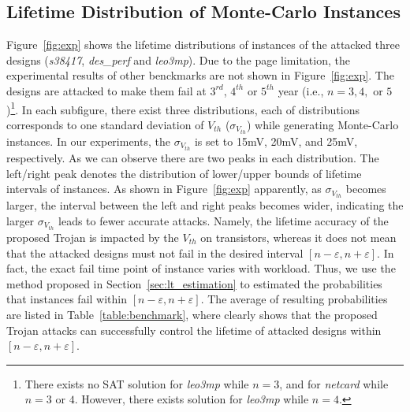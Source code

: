 \subsection{Lifetime Distribution of Monte-Carlo Instances}
\label{sec:exp:exp}
Figure~\ref{fig:exp} shows the lifetime distributions of instances of the attacked three designs (\textit{s38417}, \textit{des\_perf} and \textit{leo3mp}). Due to the page limitation, the experimental results of other benckmarks are not shown in Figure~\ref{fig:exp}. The designs are attacked to make them fail at $3^{rd}$, $4^{th}$ or $5^{th}$ year (i.e., $n = 3, 4,$ or $5$)\footnote{There exists no SAT solution for \textit{leo3mp} while $n = 3$, and for \textit{netcard} while $n = 3$ or $4$. However, there exists solution for \textit{leo3mp} while $n = 4$.}. In each subfigure, there exist three distributions, each of distributions corresponds to one standard deviation of $V_{th}$ ($\sigma_{V_{th}}$) while generating Monte-Carlo instances. In our experiments, the $\sigma_{V_{th}}$ is set to 15mV, 20mV, and 25mV, respectively. As we can observe there are two peaks in each distribution. The left/right peak denotes the distribution of lower/upper bounds of lifetime intervals of instances. %
As shown in Figure~\ref{fig:exp} apparently, as $\sigma_{V_{th}}$ becomes larger, the interval between the left and right peaks becomes wider, indicating the larger $\sigma_{V_{th}}$ leads to fewer accurate attacks. Namely, the lifetime accuracy of the proposed Trojan is impacted by the $V_{th}$ on transistors, whereas it does not mean that the attacked designs must not fail in the desired interval $[n-\varepsilon,n+\varepsilon]$. In fact, the exact fail time point of instance varies with workload.  Thus, we use the method proposed in Section~\ref{sec:lt_estimation} to estimated the probabilities that instances fail within $[n-\varepsilon,n+\varepsilon]$. The average of resulting probabilities are listed in Table~\ref{table:benchmark}, where clearly shows that the proposed Trojan attacks can successfully  control the lifetime of attacked designs within $[n-\varepsilon,n+\varepsilon]$.%

